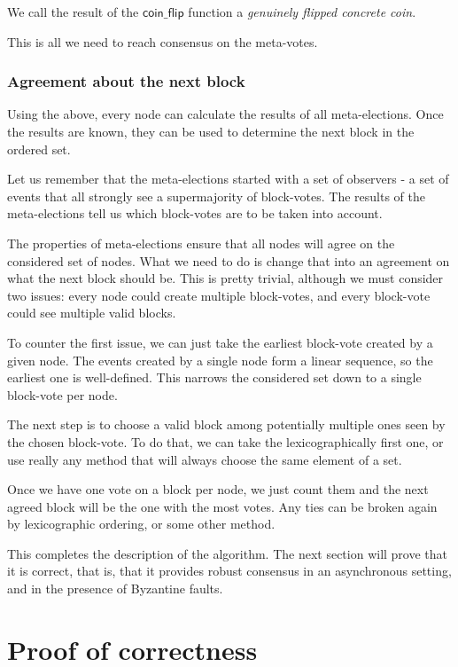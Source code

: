 \documentclass[a4paper,fleqn]{article}
\begin{document}
We call the result of the $\mathsf{coin\_flip}$ function a \emph{genuinely flipped concrete coin}.

This is all we need to reach consensus on the meta-votes.

\subsubsection{Agreement about the next block}

Using the above, every node can calculate the results of all meta-elections. Once the results are
known, they can be used to determine the next block in the ordered set.

Let us remember that the meta-elections started with a set of observers - a set of events that all
strongly see a supermajority of block-votes. The results of the meta-elections tell us which
block-votes are to be taken into account.

The properties of meta-elections ensure that all nodes will agree on the considered set of nodes.
What we need to do is change that into an agreement on what the next block should be. This is
pretty trivial, although we must consider two issues: every node could create multiple block-votes,
and every block-vote could see multiple valid blocks.

To counter the first issue, we can just take the earliest block-vote created by a given node. The
events created by a single node form a linear sequence, so the earliest one is well-defined. This
narrows the considered set down to a single block-vote per node.

The next step is to choose a valid block among potentially multiple ones seen by the chosen
block-vote. To do that, we can take the lexicographically first one, or use really any method that
will always choose the same element of a set.

Once we have one vote on a block per node, we just count them and the next agreed block will be the
one with the most votes. Any ties can be broken again by lexicographic ordering, or some other
method.

This completes the description of the algorithm. The next section will prove that it is correct,
that is, that it provides robust consensus in an asynchronous setting, and in the presence of
Byzantine faults.

\section{Proof of correctness}
\end{document}
